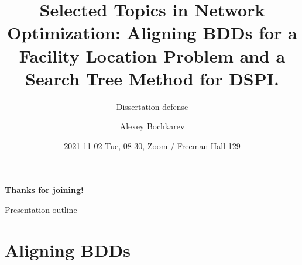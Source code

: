 \documentclass[10pt, xcolor=svgnames]{beamer}
\author{Alexey Bochkarev}
\date{2021-11-02 Tue, 08-30, Zoom / Freeman Hall 129}
\title{Selected Topics in Network Optimization: Aligning BDDs for a Facility Location Problem and a Search Tree Method for DSPI.}
\subtitle{Dissertation defense}
\begin{document}
\maketitle
{%
\begin{frame}[plain,b]
\centering
\LARGE \textbf{Thanks for joining!}\vspace{3.5ex}
\end{frame}
}%

\begin{frame}[label={sec:org33ff888}]{Presentation outline}
\tableofcontents
\end{frame}

\section{Aligning BDDs}
\label{sec:org43b2e65}
\end{document}
